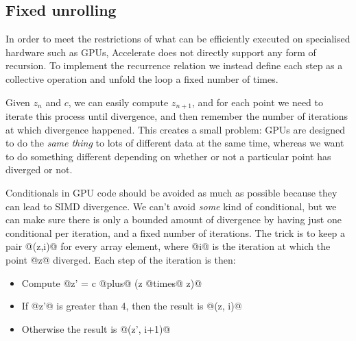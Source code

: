 \subsection{Fixed unrolling}

In order to meet the restrictions of what can be efficiently executed on
specialised hardware such as GPUs, Accelerate does not directly support any form
of recursion. To implement the recurrence relation we instead define each step
as a collective operation and unfold the loop a fixed number of times.

Given $z_{n}$ and $c$, we can easily compute $z_{n+1}$, and for each point we
need to iterate this process until divergence, and then remember the number of
iterations at which divergence happened. This creates a small problem: GPUs are
designed to do the \emph{same thing} to lots of different data at the same time,
whereas we want to do something different depending on whether or not a
particular point has diverged or not.

Conditionals in GPU code should be avoided as much as possible because they can
lead to SIMD divergence. We can't avoid \emph{some} kind of conditional, but we
can make sure there is only a bounded amount of divergence by having just one
conditional per iteration, and a fixed number of iterations. The trick is to
keep a pair @(z,i)@ for every array element, where @i@ is the
iteration at which the point @z@ diverged. Each step of the iteration is
then:
%
\begin{itemize}
    \item Compute @z' = c @plus@ (z @times@ z)@
    \item If @z'@ is greater than 4, then the result is @(z, i)@
    \item Otherwise the result is @(z', i+1)@
\end{itemize}

